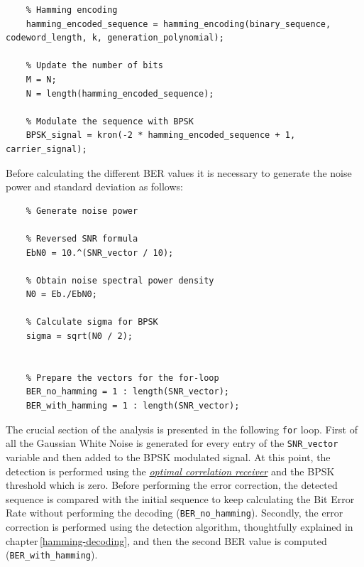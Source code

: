 \begin{lstlisting}
    % Hamming encoding
    hamming_encoded_sequence = hamming_encoding(binary_sequence, codeword_length, k, generation_polynomial);

    % Update the number of bits
    M = N;
    N = length(hamming_encoded_sequence);

    % Modulate the sequence with BPSK
    BPSK_signal = kron(-2 * hamming_encoded_sequence + 1, carrier_signal);
\end{lstlisting}

\noindent Before calculating the different BER values it is necessary to generate the noise power and standard deviation as follows:

\begin{lstlisting}
    % Generate noise power

    % Reversed SNR formula
    EbN0 = 10.^(SNR_vector / 10);
    
    % Obtain noise spectral power density
    N0 = Eb./EbN0;
    
    % Calculate sigma for BPSK
    sigma = sqrt(N0 / 2);  
    
    
    % Prepare the vectors for the for-loop
    BER_no_hamming = 1 : length(SNR_vector);
    BER_with_hamming = 1 : length(SNR_vector);
\end{lstlisting}

\noindent The crucial section of the analysis is presented in the following \texttt{for} loop. First of all the Gaussian White Noise is generated for every entry of the \texttt{SNR\_vector} variable and then added to the BPSK modulated signal. At this point, the detection is performed using the \href{https://github.com/imAlessas/telecom-lab-works/blob/main/reports/lab-4/Trigolo_Report_Lab4.pdf}{\textsl{optimal correlation receiver}} and the BPSK threshold which is zero. Before performing the error correction, the detected sequence is compared with the initial sequence to keep calculating the Bit Error Rate without performing the decoding (\texttt{BER\_no\_hamming}). Secondly, the error correction is performed using the detection algorithm, thoughtfully explained in chapter\,\ref{hamming-decoding}, and then the second BER value is computed (\texttt{BER\_with\_hamming}).


